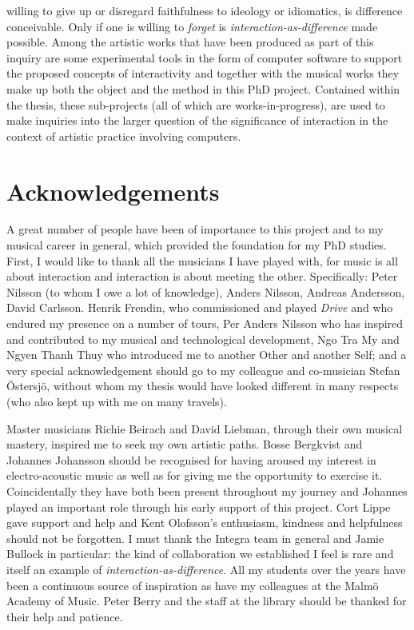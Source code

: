 willing to give up or disregard faithfulness to ideology or idiomatics, is difference conceivable. Only if one is willing to \emph{forget} is \emph{interaction-as-difference} made possible. Among the artistic works that have been produced as part of this inquiry are some experimental tools in the form of computer software to support the proposed concepts of interactivity and together with the musical works they make up both the object and the method in this PhD project. Contained within the thesis, these sub-projects (all of which are works-in-progress), are used to make inquiries into the larger question of the significance of interaction in the context of artistic practice involving computers.

\chapter*{Acknowledgements}
\label{cha:acknowledgments}

A great number of people have been of importance to this project and to my musical career in general, which provided the foundation for my PhD studies. First, I would like to thank all the musicians I have played with, for music is all about interaction and interaction is about meeting the other. Specifically: Peter Nilsson (to whom I owe a lot of knowledge), Anders Nilsson, Andreas Andersson, David Carlsson. Henrik Frendin, who commissioned and played \emph{Drive} and who endured my presence on a number of tours, Per Anders Nilsson who has inspired and contributed to my musical and technological development, Ngo Tra My and Ngyen Thanh Thuy who introduced me to another Other and another Self; and a very special acknowledgement should go to my colleague and co-musician Stefan \"{O}stersj\"{o}, without whom my thesis would have looked different in many respects (who also kept up with me on many travels).

Master musicians Richie Beirach and David Liebman, through their own musical mastery, inspired me to seek my own artistic paths. Bosse Bergkvist and Johannes Johansson should be recognised for having aroused my interest in electro-acoustic music as well as for giving me the opportunity to exercise it. Coincidentally they have both been present throughout my journey and Johannes played an important role through his early support of this project. Cort Lippe gave support and help and Kent Olofsson's enthusiasm, kindness and helpfulness should not be forgotten. I must thank the Integra team in general and Jamie Bullock in particular: the kind of collaboration we established I feel is rare and itself an example of \emph{interaction-as-difference}. All my students over the years have been a continuous source of inspiration as have my colleagues at the Malm\"{o} Academy of Music. Peter Berry and the staff at the library should be thanked for their help and patience.

